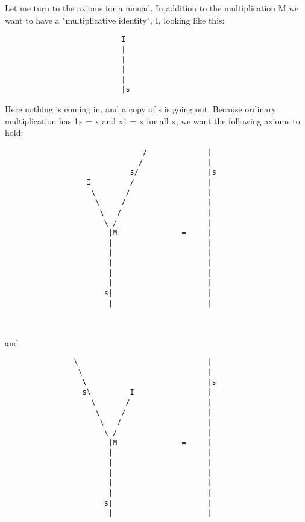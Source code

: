Let me turn to the axioms for a monad.  In addition to the multiplication
M we want to have a "multiplicative identity", I, looking like this:
           
\begin{verbatim}
                           I
                           |
                           |
                           |
                           |
                           |s

\end{verbatim}
    
Here nothing is coming in, and a copy of s is going out.  Because ordinary 
multiplication has 1x = x and x1 = x for all x, we want the following axioms 
to hold:


\begin{verbatim}
                                /              |
                               /               |
                             s/                |s
                   I         /                 |  
                    \       /                  | 
                     \     /                   |
                      \   /                    | 
                       \ /                     |
                        |M               =     | 
                        |                      |
                        |                      |
                        |                      |
                        |                      |
                        |                      | 
                       s|                      |
                        |                      | 

   
\end{verbatim}
    
and


\begin{verbatim}
                \                              |
                 \                             |
                  \                            |s
                  s\         I                 |  
                    \       /                  | 
                     \     /                   |
                      \   /                    | 
                       \ /                     |
                        |M               =     | 
                        |                      |
                        |                      |
                        |                      |
                        |                      |
                        |                      | 
                       s|                      |
                        |                      | 


\end{verbatim}
    
